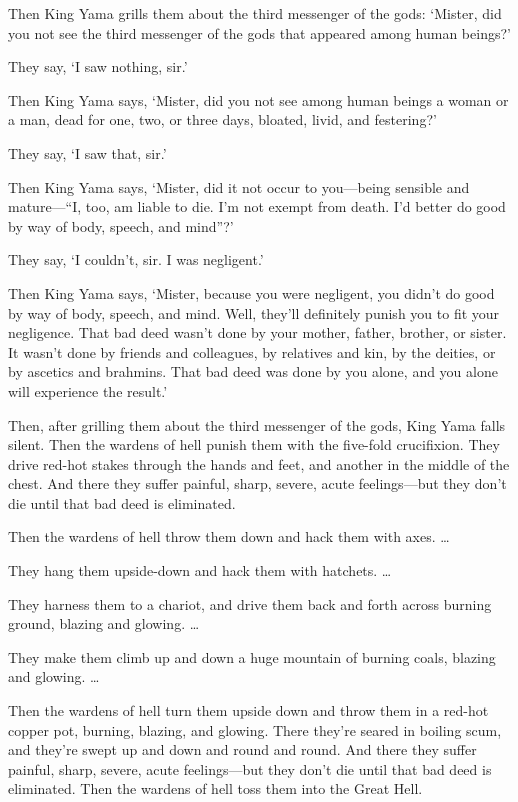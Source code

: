 \documentclass[12pt,openany]{book}%
\begin{document}
Then King Yama grills them about the third messenger of the gods: ‘Mister, did you not see the third messenger of the gods that appeared among human beings?’ 

They say, ‘I saw nothing, sir.’ 

Then King Yama says, ‘Mister, did you not see among human beings a woman or a man, dead for one, two, or three days, bloated, livid, and festering?’ 

They say, ‘I saw that, sir.’ 

Then King Yama says, ‘Mister, did it not occur to you—being sensible and mature—“I, too, am liable to die. I’m not exempt from death. I’d better do good by way of body, speech, and mind”?’ 

They say, ‘I couldn’t, sir. I was negligent.’ 

Then King Yama says, ‘Mister, because you were negligent, you didn’t do good by way of body, speech, and mind. Well, they’ll definitely punish you to fit your negligence. That bad deed wasn’t done by your mother, father, brother, or sister. It wasn’t done by friends and colleagues, by relatives and kin, by the deities, or by ascetics and brahmins. That bad deed was done by you alone, and you alone will experience the result.’ 

Then, after grilling them about the third messenger of the gods, King Yama falls silent. Then the wardens of hell punish them with the five-fold crucifixion. They drive red-hot stakes through the hands and feet, and another in the middle of the chest. And there they suffer painful, sharp, severe, acute feelings—but they don’t die until that bad deed is eliminated. 

Then the wardens of hell throw them down and hack them with axes. … 

They hang them upside-down and hack them with hatchets. … 

They harness them to a chariot, and drive them back and forth across burning ground, blazing and glowing. … 

They make them climb up and down a huge mountain of burning coals, blazing and glowing. … 

Then the wardens of hell turn them upside down and throw them in a red-hot copper pot, burning, blazing, and glowing. There they’re seared in boiling scum, and they’re swept up and down and round and round. And there they suffer painful, sharp, severe, acute feelings—but they don’t die until that bad deed is eliminated. Then the wardens of hell toss them into the Great Hell. 
\end{document}

